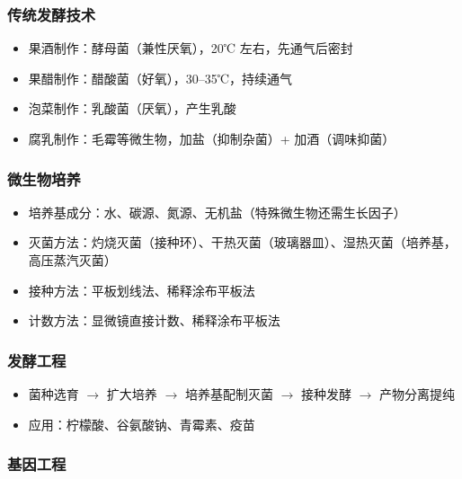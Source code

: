 \subsubsection{传统发酵技术}

\begin{itemize}
  \item 果酒制作：酵母菌（兼性厌氧），20℃ 左右，先通气后密封
  \item 果醋制作：醋酸菌（好氧），30--35℃，持续通气
  \item 泡菜制作：乳酸菌（厌氧），产生乳酸
  \item 腐乳制作：毛霉等微生物，加盐（抑制杂菌）+ 加酒（调味抑菌）
\end{itemize}

\subsubsection{微生物培养}

\begin{itemize}
  \item 培养基成分：水、碳源、氮源、无机盐（特殊微生物还需生长因子）
  \item 灭菌方法：灼烧灭菌（接种环）、干热灭菌（玻璃器皿）、湿热灭菌（培养基，高压蒸汽灭菌）
  \item 接种方法：平板划线法、稀释涂布平板法
  \item 计数方法：显微镜直接计数、稀释涂布平板法
\end{itemize}

\subsubsection{发酵工程}

\begin{itemize}
  \item 菌种选育 $\to$ 扩大培养 $\to$ 培养基配制灭菌 $\to$ 接种发酵 $\to$ 产物分离提纯
  \item 应用：柠檬酸、谷氨酸钠、青霉素、疫苗
\end{itemize}

\subsubsection{基因工程}

